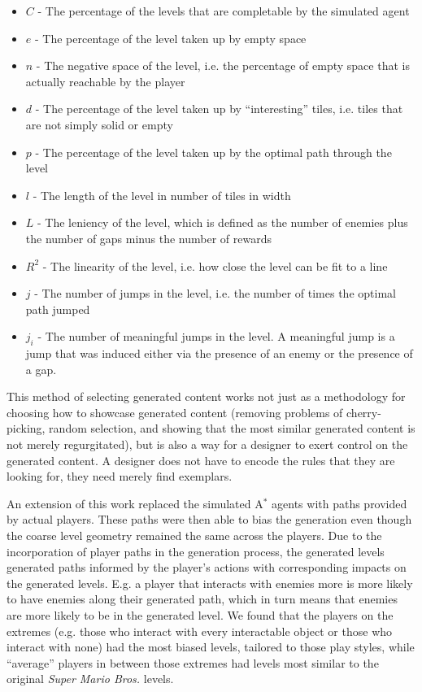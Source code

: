 \documentclass[12pt]{report}
\begin{document}
\begin{itemize}
\item $C$ - The percentage of the levels that are completable by the simulated agent
\item $e$ - The percentage of the level taken up by empty space
\item $n$ - The negative space of the level, i.e. the percentage of empty space that is actually reachable by the player
\item $d$ - The percentage of the level taken up by ``interesting'' tiles, i.e. tiles that are not simply solid or empty
\item $p$ - The percentage of the level taken up by the optimal path through the level
\item $l$ - The length of the level in number of tiles in width
\item $L$ - The leniency of the level, which is defined as the number of enemies plus the number of gaps minus the number of rewards
\item $R^2$ - The linearity of the level, i.e. how close the level can be fit to a line
\item $j$ - The number of jumps in the level, i.e. the number of times the optimal path jumped
\item $j_i$ - The number of meaningful jumps in the level.  A meaningful jump is a jump that was induced either via the presence of an enemy or the presence of a gap.
\end{itemize}

This method of selecting generated content works not just as a methodology for choosing how to showcase generated content (removing problems of cherry-picking, random selection, and showing that the most similar generated content is not merely regurgitated), but is also a way for a designer to exert control on the generated content.  A designer does not have to encode the rules that they are looking for, they need merely find exemplars.

An extension of this work replaced the simulated A$^*$ agents with paths provided by actual players.  These paths were then able to bias the generation even though the coarse level geometry remained the same across the players.  Due to the incorporation of player paths in the generation process, the generated levels generated paths informed by the player's actions with corresponding impacts on the generated levels.  E.g. a player that interacts with enemies more is more likely to have enemies along their generated path, which in turn means that enemies are more likely to be in the generated level.  We found that the players on the extremes (e.g. those who interact with every interactable object or those who interact with none) had the most biased levels, tailored to those play styles, while ``average'' players in between those extremes had levels most similar to the original \textit{Super Mario Bros.} levels.
\end{document}
